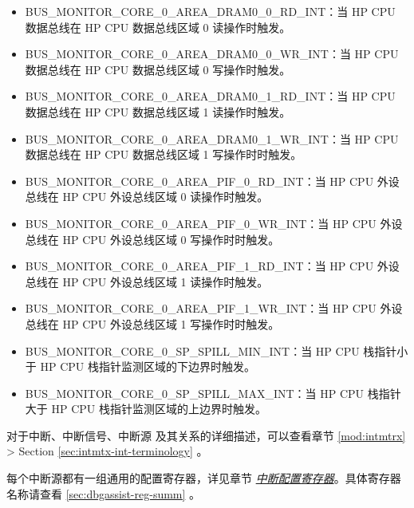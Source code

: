 \documentclass[main\_\_CN.tex]{subfiles}
\begin{document}
\begin{itemize}
    \item \label{int:BUSMONITORCORE0AREADRAM00RDINT}BUS\_MONITOR\_CORE\_0\_AREA\_DRAM0\_0\_RD\_INT：当 HP CPU 数据总线在 HP CPU 数据总线区域 0 读操作时触发。
    \item \label{int:BUSMONITORCORE0AREADRAM00WRINT}BUS\_MONITOR\_CORE\_0\_AREA\_DRAM0\_0\_WR\_INT：当 HP CPU 数据总线在 HP CPU 数据总线区域 0 写操作时触发。
    \item \label{int:BUSMONITORCORE0AREADRAM01RDINT}BUS\_MONITOR\_CORE\_0\_AREA\_DRAM0\_1\_RD\_INT：当 HP CPU 数据总线在 HP CPU 数据总线区域 1 读操作时触发。
    \item \label{int:BUSMONITORCORE0AREADRAM01WRINT}BUS\_MONITOR\_CORE\_0\_AREA\_DRAM0\_1\_WR\_INT：当 HP CPU 数据总线在 HP CPU 数据总线区域 1 写操作时时触发。
    \item \label{int:BUSMONITORCORE0AREAPIF0RDINT}BUS\_MONITOR\_CORE\_0\_AREA\_PIF\_0\_RD\_INT：当 HP CPU 外设总线在 HP CPU 外设总线区域 0 读操作时触发。
    \item \label{int:BUSMONITORCORE0AREAPIF0WRINT}BUS\_MONITOR\_CORE\_0\_AREA\_PIF\_0\_WR\_INT：当 HP CPU 外设总线在 HP CPU 外设总线区域 0 写操作时时触发。
    \item \label{int:BUSMONITORCORE0AREAPIF1RDINT}BUS\_MONITOR\_CORE\_0\_AREA\_PIF\_1\_RD\_INT：当 HP CPU 外设总线在 HP CPU 外设总线区域 1 读操作时触发。
    \item \label{int:BUSMONITORCORE0AREAPIF1WRINT}BUS\_MONITOR\_CORE\_0\_AREA\_PIF\_1\_WR\_INT：当 HP CPU 外设总线在 HP CPU 外设总线区域 1 写操作时时触发。
    \item \label{int:BUSMONITORCORE0SPSPILLMININT}BUS\_MONITOR\_CORE\_0\_SP\_SPILL\_MIN\_INT：当 HP CPU 栈指针小于 HP CPU 栈指针监测区域的下边界时触发。
    \item \label{int:BUSMONITORCORE0SPSPILLMAXINT}BUS\_MONITOR\_CORE\_0\_SP\_SPILL\_MAX\_INT：当 HP CPU 栈指针大于 HP CPU 栈指针监测区域的上边界时触发。
\end{itemize}

\begin{tiplisting}
对于中断、中断信号、中断源 及其关系的详细描述，可以查看章节 \ref{mod:intmtrx} \textit{} > Section \ref{sec:intmtx-int-terminology} \textit{}。
\end{tiplisting}

每个中断源都有一组通用的配置寄存器，详见章节 \hyperref[interrupt-config-registers]{\textit{中断配置寄存器}}。具体寄存器名称请查看 \ref{sec:dbgassist-reg-summ} \textit{}。
\end{document}

